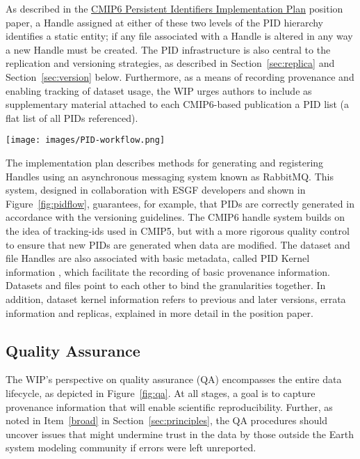 \documentclass[gmd,manuscript]{copernicus}
\newcommand{\pipref}[1] {\citep{ref:#1}}
\newcommand{\figref}[1] {\mbox{Figure   \ref{fig:#1}}}
\newcommand{\secref}[1] {\mbox{Section  \ref{sec:#1}}}
\begin{document}
As described in the \href{https://goo.gl/miUREw}{CMIP6 Persistent
  Identifiers Implementation Plan} position paper, a Handle assigned
at either of these two levels of the PID hierarchy identifies a static
entity; if any file associated with a Handle is altered in any way a
new Handle must be created. The PID infrastructure is also central to
the replication and versioning strategies, as described in
\secref{replica} and \secref{version} below. Furthermore, as a
means of recording provenance and enabling tracking of dataset usage,
the WIP urges authors to include as supplementary material attached to
each CMIP6-based publication a PID list (a flat list of all PIDs
referenced).

\begin{figure*}
  \begin{center}
    \texttt{[image: images/PID-workflow.png]}
  \end{center}
  \caption{PID workflow, showing the generation and registry of PIDs,
    with checkpoints where compliance is assured.}
  \label{fig:pidflow}
\end{figure*}

The implementation plan describes methods for generating and
registering Handles using an asynchronous messaging system known as
RabbitMQ. This system, designed in collaboration with ESGF developers
and shown in \figref{pidflow}, guarantees, for example, that PIDs are
correctly generated in accordance with the versioning guidelines. The
CMIP6 handle system builds on the idea of tracking-ids used in CMIP5,
but with a more rigorous quality control to ensure that new PIDs are
generated when data are modified. The dataset and file Handles are
also associated with basic metadata, called PID Kernel information
\pipref{zhouetal2018}, which facilitate the recording of basic
provenance information. Datasets and files point to each other to bind
the granularities together. In addition, dataset kernel information
refers to previous and later versions, errata information and
replicas, explained in more detail in the position paper.

\subsection{Quality Assurance}
\label{sec:qa}

The WIP's perspective on quality assurance (QA) encompasses the entire
data lifecycle, as depicted in \figref{qa}. At all stages, a goal is
to capture provenance information that will enable scientific
reproducibility. Further, as noted in Item~\ref{broad} in
\secref{principles}, the QA procedures should uncover issues that
might undermine trust in the data by those outside the Earth system
modeling community if errors were left unreported.
\end{document}
